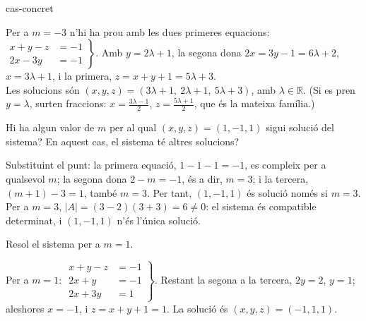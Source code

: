 \begin{apartats}
\begin{tria}{cas-concret}
\begin{solucio}
Per a $m=-3$ n'hi ha prou amb les dues primeres equacions:
$\left.\begin{aligned}x+y-z&=-1\\2x-3y&=-1\end{aligned}\right\}$. Amb $y=2\lambda+1$, la segona dona
$2x=3y-1=6\lambda+2$, $x=3\lambda+1$, i la primera, $z=x+y+1=5\lambda+3$.\\
Les solucions són $(x,y,z)=(3\lambda+1,\ 2\lambda+1,\ 5\lambda+3)$, amb $\lambda\in\mathbb R$.
(Si es pren $y=\lambda$, surten fraccions: $x=\frac{3\lambda-1}2$, $z=\frac{5\lambda+1}2$, que és la
mateixa família.)
\end{solucio}

Hi ha algun valor de $m$ per al qual $(x,y,z)=(1,-1,1)$ sigui solució del sistema? En aquest cas, el
sistema té altres solucions?

\begin{solucio}
Substituint el punt: la primera equació, $1-1-1=-1$, es compleix per a qualsevol $m$; la segona dona
$2-m=-1$, és a dir, $m=3$; i la tercera, $(m+1)-3=1$, també $m=3$. Per tant, $(1,-1,1)$ és solució
només si $m=3$.\\
Per a $m=3$, $|A|=(3-2)(3+3)=6\ne0$: el sistema és compatible determinat, i $(1,-1,1)$ n'és l'única
solució.
\end{solucio}
\end{tria}

\begin{nomesllarg}
Resol el sistema per a $m=1$.

\begin{solucio}
Per a $m=1$: $\left.\begin{aligned}x+y-z&=-1\\2x+y&=-1\\2x+3y&=1\end{aligned}\right\}$. Restant la segona
a la tercera, $2y=2$, $y=1$; aleshores $x=-1$, i $z=x+y+1=1$. La solució és $(x,y,z)=(-1,1,1)$.
\end{solucio}
\end{nomesllarg}

\end{apartats}
